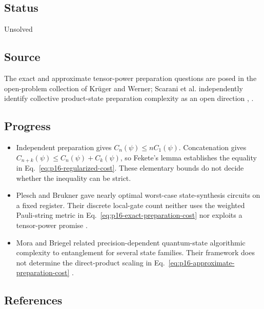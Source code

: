 \subsection*{Status}

Unsolved

\subsection*{Source}

The exact and approximate tensor-power preparation questions are posed in the
open-problem collection of Kr\"uger and Werner; Scarani et al. independently
identify collective product-state preparation complexity as an open direction
,
.

\subsection*{Progress}

\begin{itemize}
  \item Independent preparation gives
  $C_n(\psi)\le nC_1(\psi)$.  Concatenation gives
  $C_{n+k}(\psi)\le C_n(\psi)+C_k(\psi)$, so Fekete's lemma establishes the
  equality in Eq.~\eqref{eq:p16-regularized-cost}.  These elementary bounds do
  not decide whether the inequality can be strict.

  \item Plesch and Brukner gave nearly optimal worst-case state-synthesis
  circuits on a fixed register.  Their discrete local-gate count neither uses
  the weighted Pauli-string metric in
  Eq.~\eqref{eq:p16-exact-preparation-cost} nor exploits a tensor-power promise
  .

  \item Mora and Briegel related precision-dependent quantum-state
  algorithmic complexity to entanglement for several state families.  Their
  framework does not determine the direct-product scaling in
  Eq.~\eqref{eq:p16-approximate-preparation-cost}
  .
\end{itemize}

\subsection*{References}

